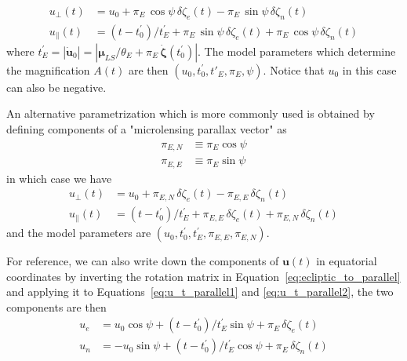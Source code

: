 \documentclass[12pt,dvipsnames]{report}
\begin{document}
\begin{align}
    u_\bot(t)      & = u_0 + \pi_E\,\cos\psi\,\delta \zeta_e(t) - \pi_E\,\sin\psi\,\delta \zeta_n(t)
    \label{eq:u_t_parallel1}                                                                         \\
    u_\parallel(t) & =(t-t_0^\prime)/t_E^\prime + \pi_E\,\sin\psi\,\delta \zeta_e(t) +
    \pi_E\,\cos\psi\,\delta \zeta_n(t) \label{eq:u_t_parallel2}
\end{align}
where $t_E^\prime =|\dot{\mathbf{u}}_0|=|\boldsymbol\mu_{LS}/\theta_E  + \pi_E\,\dot{\boldsymbol \zeta}(t_0^\prime)|$.
The model parameters which determine the magnification $A(t)$ are then
$\left(u_0,t_0^\prime,t'_E,\pi_E,\psi\right)$. Notice that $u_0$ in this case can also be negative.

An alternative parametrization which is more commonly used is obtained by
defining components of a "microlensing parallax vector" as
\begin{align}
    \pi_{E,N} & \equiv \pi_E\cos\psi \\
    \pi_{E,E} & \equiv \pi_E\sin\psi
\end{align}
in which case we have
\begin{align}
    u_\bot(t)      & = u_0 + \pi_{E,N}\,\delta \zeta_e(t) - \pi_{E,E}\,\delta \zeta_n(t) \\
    u_\parallel(t) & =(t-t_0^\prime)/t_E^\prime + \pi_{E,E}\,\delta\zeta_e(t) +
    \pi_{E,N}\,\delta\zeta_n(t)
\end{align}
and the model parameters are $\left(u_0,t_0^\prime,t_E^\prime,\pi_{E,E},\pi_{E,N}\right)$.

For reference, we can also write down the components of $\mathbf{u}(t)$ in
equatorial coordinates by inverting the rotation matrix in
Equation~\ref{eq:ecliptic_to_parallel} and applying it to
Equations~\ref{eq:u_t_parallel1} and \ref{eq:u_t_parallel2}, the two components
are then
\begin{align}
    u_e & =u_0\cos\psi + (t-t_0^\prime)/t_E^\prime\sin\psi + \pi_E\,\delta\zeta_e(t)  
    \label{eq:u_t_east}\\
    u_n & =-u_0\sin\psi + (t-t_0^\prime)/t_E^\prime\cos\psi + \pi_E\,\delta\zeta_n(t)
    \label{eq:u_t_north}
\end{align}
\end{document}
